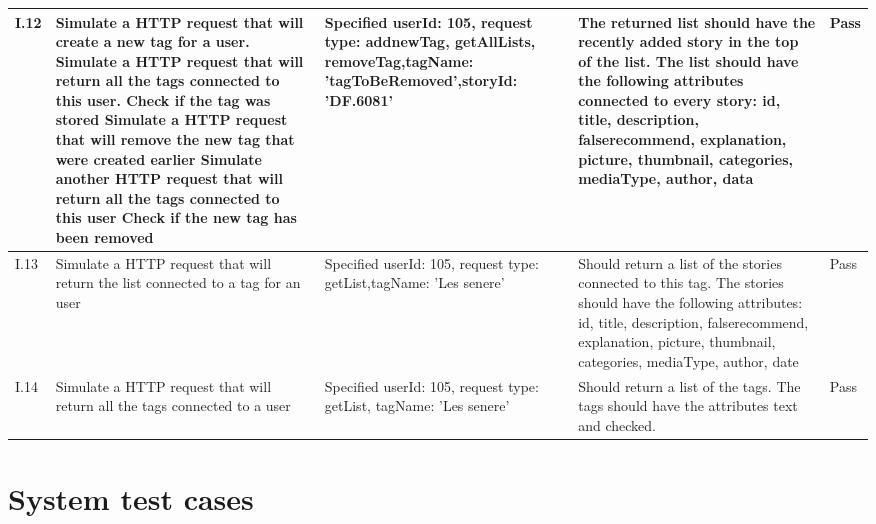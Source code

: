\begin{appendices}
\begin{center}
\begin{longtable}{ | p{1cm} | p{5.5cm} | p{4cm} | p{4.5cm} | p{2cm}|}
		I.12 & Simulate a HTTP request that will create a new tag for a user. \newline  Simulate a HTTP request that will return all the tags connected to this user. \newline Check if the tag was stored \newline Simulate a HTTP request that will remove the new tag that were created earlier \newline Simulate another HTTP request that will return all the tags connected to this user \newline Check if the new tag has been removed  & Specified userId: 105, \newline request type: addnewTag, getAllLists, removeTag,\newline tagName: 'tagToBeRemoved',\newline storyId: 'DF.6081' & The returned list should have the recently added story in the top of the list. The list should have the following attributes connected to every story: id, title, description, false\textunderscore recommend, explanation, picture, thumbnail, categories, mediaType, author, data  & Pass\\ \hline
		
		
		I.13 & Simulate a HTTP request that will return the list connected to a tag for an user  & Specified userId: 105, request type: getList,\newline tagName: 'Les senere' & Should return a list of the stories connected to this tag. The stories should have the following attributes: id, title, description, false\textunderscore recommend, explanation, picture, thumbnail, categories, mediaType, author, date & Pass\\ \hline					
		
		
		I.14 & Simulate a HTTP request that will return all the tags connected to a user  & Specified userId: 105, \newline request type: getList, \newline tagName: 'Les senere' & Should return a list of the tags. The tags should have the attributes text and checked. & Pass\\ \hline	
		
	\end{longtable}
\end{center}
\raggedbottom
\newpage		

\section{System test cases}
\label{app:systemtest}


\end{appendices}
